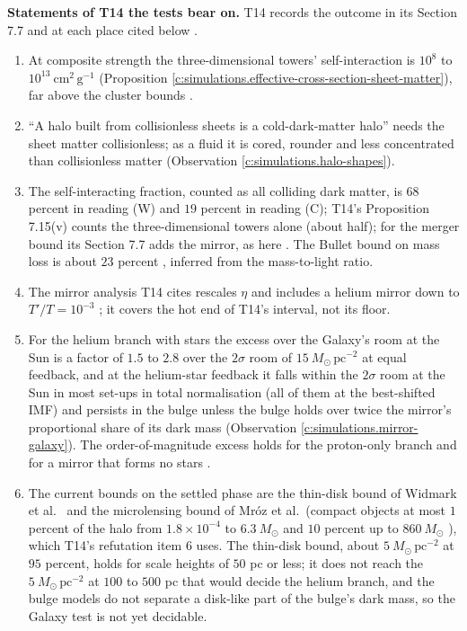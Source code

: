 \documentclass[11pt]{article}
\theoremstyle{definition}
\theoremstyle{plain}
\providecommand{\Msun}{}\renewcommand{\Msun}{M_{\odot}}
\providecommand{\cmg}{}\renewcommand{\cmg}{\mathrm{cm^{2}\,g^{-1}}}
\begin{document}
\label{c:note.simulations.setting-what-tests-decide-what-they-3}
\textbf{Statements of T14 the tests bear on.} T14 records the outcome in its Section 7.7 and at each place cited below \cite[Fact~7.32]{ButlerT14}.
\begin{enumerate}
\item At composite strength the three-dimensional towers' self-interaction is $10^{8}$ to $10^{13}\ \cmg$ (Proposition \ref{c:simulations.effective-cross-section-sheet-matter}), far above the cluster bounds \cite[Prop.~6.2]{ButlerT14}.
\item ``A halo built from collisionless sheets is a cold-dark-matter halo'' \cite[Rem.~7.30]{ButlerT14} needs the sheet matter collisionless; as a fluid it is cored, rounder and less concentrated than collisionless matter (Observation \ref{c:simulations.halo-shapes}).
\item The self-interacting fraction, counted as all colliding dark matter, is $68$ percent in reading (W) and $19$ percent in reading (C); T14's Proposition 7.15(v) counts the three-dimensional towers alone (about half); for the merger bound its Section 7.7 adds the mirror, as here \cite[Prop.~7.15(v), \S7.7]{ButlerT14}. The Bullet bound on mass loss is about $23$ percent \cite{Randall2008}, inferred from the mass-to-light ratio.
\item The mirror analysis T14 cites \cite[\S 8, refutation item 6]{ButlerT14} rescales $\eta$ and includes a helium mirror down to $T'/T = 10^{-3}$ \cite{RouxCline2020}; it covers the hot end of T14's interval, not its floor.
\item For the helium branch with stars the excess over the Galaxy's room at the Sun is a factor of $1.5$ to $2.8$ over the $2\sigma$ room of $15\ \Msun\,\mathrm{pc^{-2}}$ at equal feedback, and at the helium-star feedback it falls within the $2\sigma$ room at the Sun in most set-ups in total normalisation (all of them at the best-shifted IMF) and persists in the bulge unless the bulge holds over twice the mirror's proportional share of its dark mass (Observation \ref{c:simulations.mirror-galaxy}). The order-of-magnitude excess holds for the proton-only branch and for a mirror that forms no stars \cite[\S 8, refutation item 6]{ButlerT14}.
\item The current bounds on the settled phase are the thin-disk bound of Widmark et al.\ \cite{Widmark2021} and the microlensing bound of Mr\'oz et al.\ (compact objects at most $1$ percent of the halo from $1.8 \times 10^{-4}$ to $6.3\ \Msun$ and $10$ percent up to $860\ \Msun$ \cite{Mroz2024}), which T14's refutation item 6 uses. The thin-disk bound, about $5\ \Msun\,\mathrm{pc^{-2}}$ at $95$ percent, holds for scale heights of $50$ pc or less; it does not reach the $5\ \Msun\,\mathrm{pc^{-2}}$ at $100$ to $500$ pc that would decide the helium branch, and the bulge models \cite{Portail2017} do not separate a disk-like part of the bulge's dark mass, so the Galaxy test is not yet decidable.
\end{enumerate}
\end{document}
